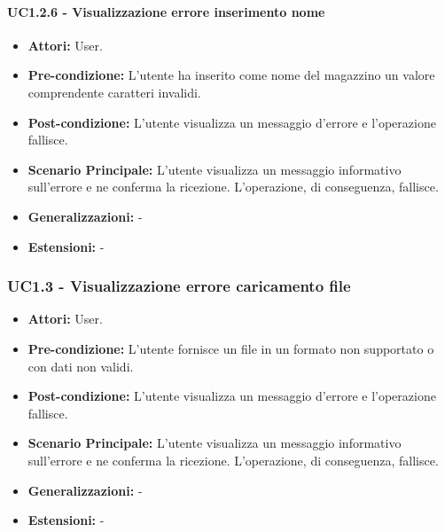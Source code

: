 \paragraph{UC1.2.6 - Visualizzazione errore inserimento nome}
\begin{itemize}
    \item \textbf{Attori:} User.
    \item \textbf{Pre-condizione:}  L'utente ha inserito come nome del magazzino un valore comprendente caratteri invalidi.
    \item \textbf{Post-condizione:} L'utente visualizza un messaggio d'errore e l'operazione fallisce.
    \item \textbf{Scenario Principale:}  L'utente visualizza un messaggio informativo sull'errore e ne conferma la ricezione. L'operazione, di conseguenza, fallisce.
    \item \textbf{Generalizzazioni:} -
    \item \textbf{Estensioni:} -
\end{itemize}


\subsubsection{UC1.3 - Visualizzazione errore caricamento file}
\begin{itemize}
    \item \textbf{Attori:} User.
    \item \textbf{Pre-condizione:} L'utente fornisce un file in un formato non supportato o con dati non validi.
    \item \textbf{Post-condizione:} L'utente visualizza un messaggio d'errore e l'operazione fallisce.
    \item \textbf{Scenario Principale:}  L'utente visualizza un messaggio informativo sull'errore e ne conferma la ricezione. L'operazione, di conseguenza, fallisce.
    \item \textbf{Generalizzazioni:} -
    \item \textbf{Estensioni:} -
\end{itemize}